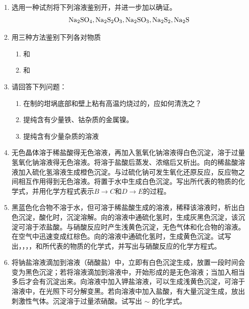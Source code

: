 \begin{enumerate}[label=\arabic*., start=1, itemsep=1.5ex]
    \item 选用一种试剂将下列溶液鉴别开，并进一步加以确证。
    \[
    \ce{Na2SO4}, \ce{Na2S2O3}, \ce{Na2SO3}, \ce{Na2S2}, \ce{Na2S}
    \]
    \item 用三种方法鉴别下列各对物质
    \begin{enumerate}[label=(\arabic*), itemsep=1ex]
        \item {}和
        \item {}和
    \end{enumerate}
    \item 请回答下列问题：
    \begin{enumerate}[label=(\arabic*), itemsep=1ex]
        \item 在制的坩埚底部和壁上粘有高温灼烧过的，应如何清洗之？
        \item 提纯含有少量铁、钴杂质的金属镍。
        \item 提纯含有少量杂质的溶液
    \end{enumerate}
    \item 无色晶体溶于稀盐酸得无色溶液，再加入氢氧化钠溶液得白色沉淀，溶于过量氢氧化钠溶液得无色溶液。将溶于盐酸后蒸发、浓缩后又析出。向的稀盐酸溶液加入硫化氢溶液生成橙色沉淀。与过硫化钠可发生氧化还原反应，反应物之间相互作用得到无色溶液。将置于水中生成白色沉淀。写出所代表的物质的化学式，并用化学方程式表示$B\rightarrow C$和$D\rightarrow E$的过程。
    \item 黑蓝色化合物不溶于水，但可溶于稀盐酸生成的溶液，稀释该溶液时，析出白色沉淀，酸化时，沉淀溶解。向的溶液中通硫化氢时，生成灰黑色沉淀，该沉淀可溶于浓盐酸。与硝酸反应时产生浅黄色沉淀，无色气体和化合物的溶液。在空气中迅速变成红棕色。向的溶液中通硫化氢时，生成黄色沉淀。试写出，，，，和所代表的物质的化学式，并写出与硝酸反应的化学方程式。
    \item 将钠盐溶液滴加到溶液（硝酸盐）中，立即有白色沉淀生成，放置一段时间会变为黑色沉淀；若将溶液滴加到溶液中，开始形成的是无色溶液；当加入相当多后才会有沉淀出来。向溶液中加入钾盐溶液，可以生成浅黄色沉淀，可溶于溶液中，在光照下可分解变黑。若向溶液中加入盐酸，有大量沉淀生成，放出刺激性气体。沉淀溶于过量浓硝酸。试写出 $\sim$ 的化学式。
\end{enumerate}
